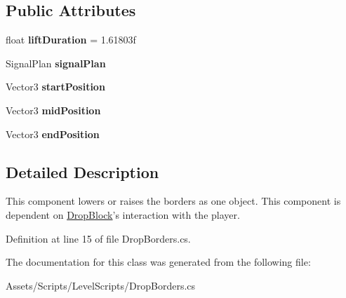 \subsection*{Public Attributes}
\begin{DoxyCompactItemize}
\item 
\hypertarget{class_drop_borders_a50655a57d9e07d963714c063a423e7f4}{float {\bfseries lift\+Duration} = 1.\+61803f}\label{class_drop_borders_a50655a57d9e07d963714c063a423e7f4}

\item 
\hypertarget{class_drop_borders_ac010c9e198f3c259aed9eb5c528497bf}{Signal\+Plan {\bfseries signal\+Plan}}\label{class_drop_borders_ac010c9e198f3c259aed9eb5c528497bf}

\item 
\hypertarget{class_drop_borders_a49d34ce07e3ff3b8ad01654885affc11}{Vector3 {\bfseries start\+Position}}\label{class_drop_borders_a49d34ce07e3ff3b8ad01654885affc11}

\item 
\hypertarget{class_drop_borders_a11d6836a093ba27bc5acc7f40ce107eb}{Vector3 {\bfseries mid\+Position}}\label{class_drop_borders_a11d6836a093ba27bc5acc7f40ce107eb}

\item 
\hypertarget{class_drop_borders_a3af3fe0fd4deaaa199e05f78914bf316}{Vector3 {\bfseries end\+Position}}\label{class_drop_borders_a3af3fe0fd4deaaa199e05f78914bf316}

\end{DoxyCompactItemize}


\subsection{Detailed Description}
This component lowers or raises the borders as one object. This component is dependent on \hyperlink{class_drop_block}{Drop\+Block}'s interaction with the player. 



Definition at line 15 of file Drop\+Borders.\+cs.



The documentation for this class was generated from the following file\+:\begin{DoxyCompactItemize}
\item 
Assets/\+Scripts/\+Level\+Scripts/Drop\+Borders.\+cs\end{DoxyCompactItemize}
